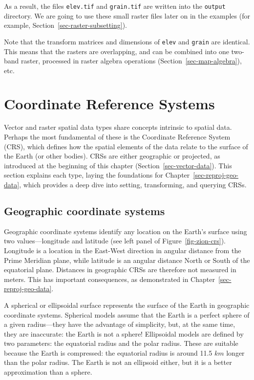\documentclass[
  letterpaper,
]{krantz}
\begin{document}
As a result, the files \texttt{elev.tif} and \texttt{grain.tif} are
written into the \texttt{output} directory. We are going to use these
small raster files later on in the examples (for example,
Section~\ref{sec-raster-subsetting}).

Note that the transform matrices and dimensions of \texttt{elev} and
\texttt{grain} are identical. This means that the rasters are
overlapping, and can be combined into one two-band raster, processed in
raster algebra operations (Section~\ref{sec-map-algebra}), etc.

\section{Coordinate Reference
Systems}\label{sec-coordinate-reference-systems-intro}

Vector and raster spatial data types share concepts intrinsic to spatial
data. Perhaps the most fundamental of these is the Coordinate Reference
System (CRS), which defines how the spatial elements of the data relate
to the surface of the Earth (or other bodies). CRSs are either
geographic or projected, as introduced at the beginning of this chapter
(Section~\ref{sec-vector-data}). This section explains each type, laying
the foundations for Chapter~\ref{sec-reproj-geo-data}, which provides a
deep dive into setting, transforming, and querying CRSs.

\subsection{Geographic coordinate
systems}\label{geographic-coordinate-systems}

Geographic coordinate systems identify any location on the Earth's
surface using two values---longitude and latitude (see left panel of
Figure~\ref{fig-zion-crs}). Longitude is a location in the East-West
direction in angular distance from the Prime Meridian plane, while
latitude is an angular distance North or South of the equatorial plane.
Distances in geographic CRSs are therefore not measured in meters. This
has important consequences, as demonstrated in
Chapter~\ref{sec-reproj-geo-data}.

A spherical or ellipsoidal surface represents the surface of the Earth
in geographic coordinate systems. Spherical models assume that the Earth
is a perfect sphere of a given radius---they have the advantage of
simplicity, but, at the same time, they are inaccurate: the Earth is not
a sphere! Ellipsoidal models are defined by two parameters: the
equatorial radius and the polar radius. These are suitable because the
Earth is compressed: the equatorial radius is around 11.5 \(km\) longer
than the polar radius. The Earth is not an ellipsoid either, but it is a
better approximation than a sphere.
\end{document}

